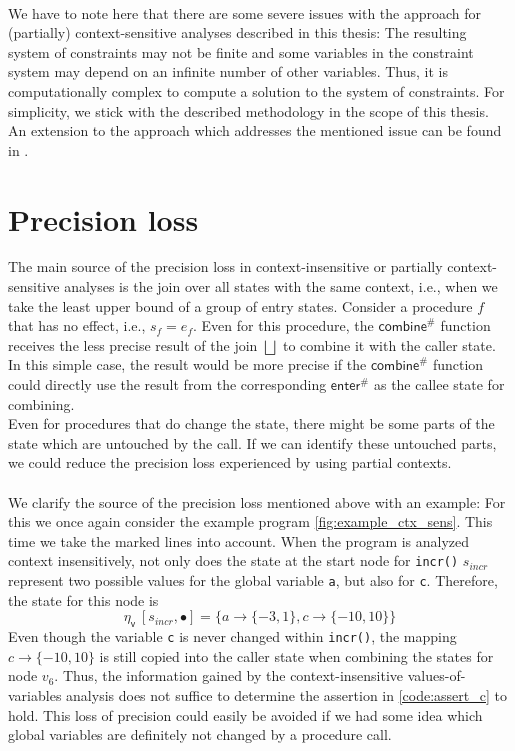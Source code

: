     \\
    We have to note here that there are some severe issues with the approach for (partially) context-sensitive analyses described in this thesis: The resulting system of constraints may not be finite and some variables in the constraint system may depend on an infinite number of other variables. Thus, it is computationally complex to compute a solution to the system of constraints. For simplicity, we stick with the described methodology in the scope of this thesis.\\
    An extension to the approach which addresses the mentioned issue can be found in \parencite{apinis2012side}.

  \section{Precision loss}\label{sec:precisionLoss}
    The main source of the precision loss in context-insensitive or partially context-sensitive analyses is the join over all states with the same context, i.e., when we take the least upper bound of a group of entry states. Consider a procedure $f$ that has no effect, i.e., $s_f = e_f$. Even for this procedure, the $\textsf{combine}^{\#}$ function receives the less precise result of the join $\bigsqcup$ to combine it with the caller state. In this simple case, the result would be more precise if the $\textsf{combine}^{\#}$ function could directly use the result from the corresponding $\textsf{enter}^{\#}$ as the callee state for combining.\\
    Even for procedures that do change the state, there might be some parts of the state which are untouched by the call. If we can identify these untouched parts, we could reduce the precision loss experienced by using partial contexts.\\
    \\
    We clarify the source of the precision loss mentioned above with an example: For this we once again consider the example program \autoref{fig:example_ctx_sens}. This time we take the marked lines into account. When the program is analyzed context insensitively, not only does the state at the start node for \texttt{incr()} $s_{incr}$ represent two possible values for the global variable \texttt{a}, but also for \texttt{c}. Therefore, the state for this node is
    \[\eta_\textsf{v}\ [s_{incr}, \bullet] = \{a \rightarrow \{-3, 1\}, c \rightarrow \{-10, 10\}\} \]
    Even though the variable \texttt{c} is never changed within \texttt{incr()}, the mapping $c \rightarrow \{-10, 10\}$ is still copied into the caller state when combining the states for node $v_6$. Thus, the information gained by the context-insensitive values-of-variables analysis does not suffice to determine the assertion in \autoref{code:assert_c} to hold. This loss of precision could easily be avoided if we had some idea which global variables are definitely not changed by a procedure call.


